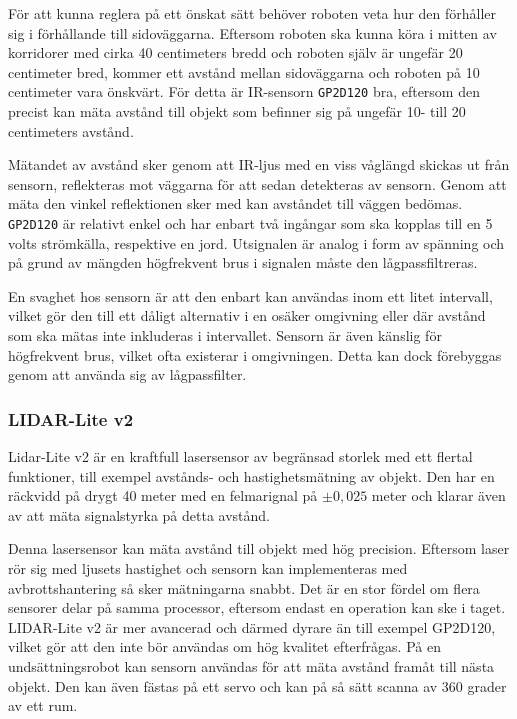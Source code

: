 \documentclass[11pt]{article}
\begin{document}
\begin{flushleft}
För att kunna reglera på ett önskat sätt behöver roboten veta hur den förhåller sig i förhållande till sidoväggarna. Eftersom roboten ska kunna köra i mitten av korridorer med cirka 40 centimeters bredd och roboten själv är ungefär 20 centimeter bred, kommer ett avstånd mellan sidoväggarna och roboten på 10 centimeter vara önskvärt. För detta är IR-sensorn \verb+GP2D120+ bra, eftersom den precist kan mäta avstånd till objekt som befinner sig på ungefär 10- till 20 centimeters avstånd.

Mätandet av avstånd sker genom att IR-ljus med en viss våglängd skickas ut från sensorn, reflekteras mot väggarna för att sedan detekteras av sensorn. Genom att mäta den vinkel reflektionen sker med kan avståndet till väggen bedömas. \verb+GP2D120+ är relativt enkel och har enbart två ingångar som ska kopplas till en 5 volts strömkälla, respektive en jord.  Utsignalen är analog i form av spänning och på grund av mängden högfrekvent brus i signalen måste den lågpassfiltreras. \cite{Sharp}

En svaghet hos sensorn är att den enbart kan användas inom ett litet intervall, vilket gör den till ett dåligt alternativ i en osäker omgivning eller där avstånd som ska mätas inte inkluderas i intervallet. Sensorn är även känslig för högfrekvent brus, vilket ofta existerar i omgivningen. Detta kan dock förebyggas genom att använda sig av lågpassfilter. \cite{Sharp}

\subsubsection{LIDAR-Lite v2}
Lidar-Lite v2 är en kraftfull lasersensor av begränsad storlek med ett flertal funktioner, till exempel avstånds- och hastighetsmätning av objekt. Den har en räckvidd på drygt 40 meter med en felmarignal på $\pm 0,025$ meter och klarar även av att mäta signalstyrka på detta avstånd. \cite{Lidar}

Denna lasersensor kan mäta avstånd till objekt med hög precision. Eftersom laser rör sig med ljusets hastighet och sensorn kan implementeras med avbrottshantering så sker mätningarna snabbt. Det är en stor fördel om flera sensorer delar på samma processor, eftersom endast en operation kan ske i taget. LIDAR-Lite v2 är mer avancerad och därmed dyrare än till exempel GP2D120, vilket gör att den inte bör användas om hög kvalitet efterfrågas. På en undsättningsrobot kan sensorn användas för att mäta avstånd framåt till nästa objekt. Den kan även fästas på ett servo och kan på så sätt scanna av 360 grader av ett rum. \cite{Lidar}


\end{flushleft}
\end{document}
